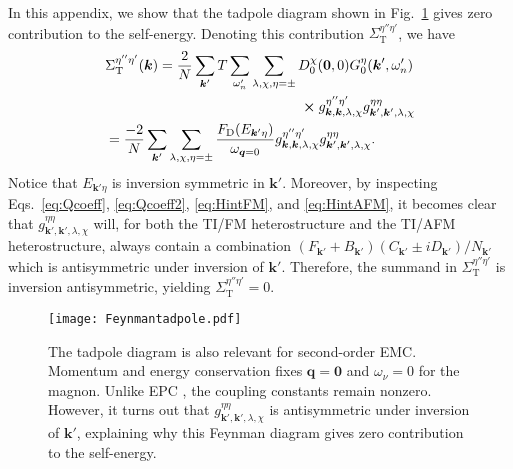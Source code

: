 \documentclass[aps, prb, twocolumn,amsmath,amssymb,floatfix]{revtex4-2}
\begin{document}
In this appendix, we show that the tadpole diagram shown in Fig.~\ref{fig:tadpole} gives zero contribution to the self-energy. Denoting this contribution $\Sigma_{\textrm{T}}^{\eta''\eta'}$, we have
\begin{align}
    &\Sigma_{\textrm{T}}^{\eta''\eta'}(\boldsymbol{k}) = \frac{2}{N}\sum_{\boldsymbol{k}'}T\sum_{\omega'_n}\sum_{\lambda, \chi, \eta = \pm} D_0^\chi(\boldsymbol{0}, 0) G_0^\eta(\boldsymbol{k}', \omega'_n) \nonumber \\
    & \mbox{\qquad\qquad\qquad\qquad\qquad\qquad\qquad} \cross g_{\boldsymbol{k}, \boldsymbol{k}, \lambda, \chi}^{\eta''\eta'}g_{\boldsymbol{k}',\boldsymbol{k}',\lambda,\chi}^{\eta\eta} \nonumber \\
    &=  \frac{-2}{N}\sum_{\boldsymbol{k}'}\sum_{\lambda, \chi, \eta = \pm} \frac{F_{\textrm{D}}(E_{\boldsymbol{k}'\eta})}{\omega_{\boldsymbol{q}=0}}g_{\boldsymbol{k}, \boldsymbol{k}, \lambda, \chi}^{\eta''\eta'}g_{\boldsymbol{k}',\boldsymbol{k}',\lambda,\chi}^{\eta\eta}.
\end{align}
Notice that $E_{\boldsymbol{k}'\eta}$ is inversion symmetric in $\boldsymbol{k}'$.
Moreover, by inspecting Eqs.~\eqref{eq:Qcoeff}, \eqref{eq:Qcoeff2}, \eqref{eq:HintFM}, and \eqref{eq:HintAFM}, it becomes clear that $g_{\boldsymbol{k}',\boldsymbol{k}',\lambda,\chi}^{\eta\eta}$ will, for both the TI/FM heterostructure and the TI/AFM heterostructure, always contain a combination $(F_{\boldsymbol{k}'}+B_{\boldsymbol{k}'})(C_{\boldsymbol{k}'}\pm iD_{\boldsymbol{k}'})/N_{\boldsymbol{k}'}$ which is antisymmetric under inversion of $\boldsymbol{k}'$. Therefore, the summand in $\Sigma_{\textrm{T}}^{\eta''\eta'}$ is inversion antisymmetric, yielding $\Sigma_{\textrm{T}}^{\eta''\eta'} = 0$.

\begin{figure}[htb]
    \centering
    \texttt{[image: Feynmantadpole.pdf]}
    \caption{The tadpole diagram is also relevant for second-order EMC. Momentum and energy conservation fixes $\boldsymbol{q} = \boldsymbol{0}$ and $\omega_\nu = 0$ for the magnon. Unlike EPC \cite{GiraudEgger}, the coupling constants remain nonzero. However, it turns out that $g_{\boldsymbol{k}',\boldsymbol{k}',\lambda,\chi}^{\eta\eta}$ is antisymmetric under inversion of $\boldsymbol{k}'$, explaining why this Feynman diagram gives zero contribution to the self-energy.}
    \label{fig:tadpole}
\end{figure}


\end{document}
